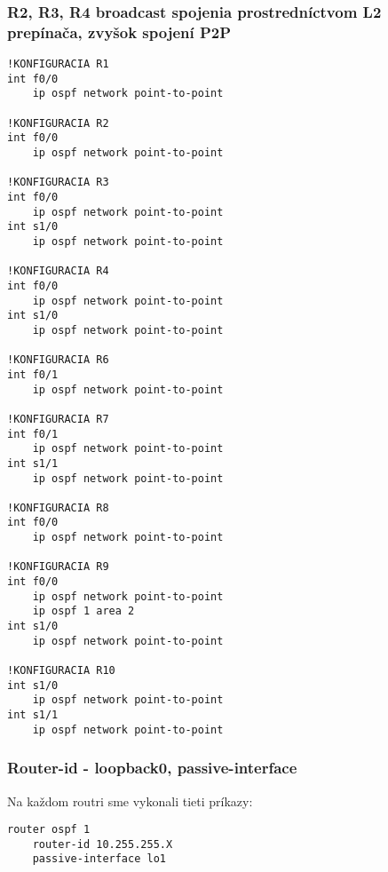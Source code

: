 \documentclass[12pt,twoside,a4paper]{article}
\begin{document}
\subsubsection*{R2, R3, R4 broadcast spojenia prostredníctvom L2 prepínača, zvyšok spojení P2P}

\noindent
{\selectfont

\begin{small}

\begin{verbatim}
!KONFIGURACIA R1
int f0/0
    ip ospf network point-to-point

!KONFIGURACIA R2
int f0/0
    ip ospf network point-to-point

!KONFIGURACIA R3
int f0/0
    ip ospf network point-to-point
int s1/0
    ip ospf network point-to-point

!KONFIGURACIA R4
int f0/0
    ip ospf network point-to-point
int s1/0
    ip ospf network point-to-point

!KONFIGURACIA R6
int f0/1
    ip ospf network point-to-point

!KONFIGURACIA R7
int f0/1
    ip ospf network point-to-point
int s1/1
    ip ospf network point-to-point

!KONFIGURACIA R8
int f0/0
    ip ospf network point-to-point

!KONFIGURACIA R9
int f0/0
    ip ospf network point-to-point
    ip ospf 1 area 2
int s1/0
    ip ospf network point-to-point

!KONFIGURACIA R10
int s1/0
    ip ospf network point-to-point
int s1/1
    ip ospf network point-to-point
\end{verbatim}

\end{small}

}


\subsubsection*{Router-id - loopback0, passive-interface}

Na každom routri sme vykonali tieti príkazy:
\noindent
{\selectfont

\begin{small}

\begin{verbatim}
router ospf 1
    router-id 10.255.255.X
    passive-interface lo1
\end{verbatim}

\end{small}

}
\end{document}
